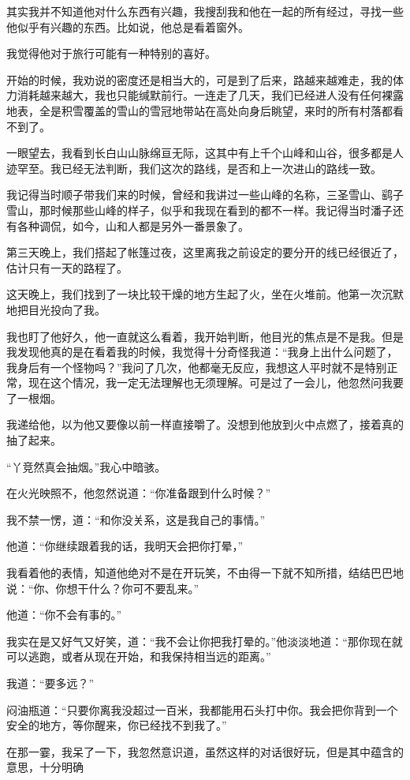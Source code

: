 其实我并不知道他对什么东西有兴趣，我搜刮我和他在一起的所有经过，寻找一些他似乎有兴趣的东西。比如说，他总是看着窗外。

我觉得他对于旅行可能有一种特别的喜好。

开始的时候，我劝说的密度还是相当大的，可是到了后来，路越来越难走，我的体力消耗越来越大，我也只能缄默前行。一连走了几天，我们已经进人没有任何裸露地表，全是积雪覆盖的雪山的雪冠地带站在高处向身后眺望，来时的所有村落都看不到了。

一眼望去，我看到长白山山脉绵亘无际，这其中有上千个山峰和山谷，很多都是人迹罕至。我已经无法判断，我们这次的路线，是否和上一次进山的路线一致。

我记得当时顺子带我们来的时候，曾经和我讲过一些山峰的名称，三圣雪山、鹞子雪山，那时候那些山峰的样子，似乎和我现在看到的都不一样。我记得当时潘子还有各种调侃，如今，山和人都是另外一番景象了。

第三天晚上，我们搭起了帐篷过夜，这里离我之前设定的要分开的线已经很近了，估计只有一天的路程了。

这天晚上，我们找到了一块比较干燥的地方生起了火，坐在火堆前。他第一次沉默地把目光投向了我。

我也盯了他好久，他一直就这么看着，我开始判断，他目光的焦点是不是我。但是我发现他真的是在看着我的时候，我觉得十分奇怪我道：“我身上出什么问题了，我身后有一个怪物吗？”我问了几次，他都毫无反应，我想这人平时就不是特别正常，现在这个情况，我一定无法理解也无须理解。可是过了一会儿，他忽然问我要了一根烟。

我递给他，以为他又要像以前一样直接嚼了。没想到他放到火中点燃了，接着真的抽了起来。

“丫竞然真会抽烟。”我心中暗骇。

在火光映照不，他忽然说道：“你准备跟到什么时候？”

我不禁一愣，道：“和你没关系，这是我自己的事情。”

他道：“你继续跟着我的话，我明天会把你打晕，”

我看着他的表情，知道他绝对不是在开玩笑，不由得一下就不知所措，结结巴巴地说：“你、你想干什么？你可不要乱来。”

他道：“你不会有事的。”

我实在是又好气又好笑，道：“我不会让你把我打晕的。”他淡淡地道：“那你现在就可以逃跑，或者从现在开始，和我保持相当远的距离。”

我道：“要多远？”

闷油瓶道：“只要你离我没超过一百米，我都能用石头打中你。我会把你背到一个安全的地方，等你醒来，你已经找不到我了。”

在那一霎，我呆了一下，我忽然意识道，虽然这样的对话很好玩，但是其中蕴含的意思，十分明确

